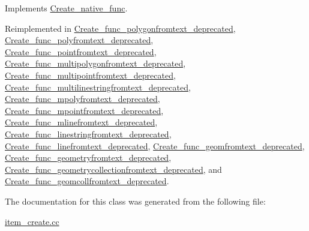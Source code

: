 Implements \mbox{\hyperlink{classCreate__native__func_a52a42d6a191ca6e9627fb34d91e97ebc}{Create\+\_\+native\+\_\+func}}.



Reimplemented in \mbox{\hyperlink{classCreate__func__polygonfromtext__deprecated_ae42cae5e01546d848a75369762244ca5}{Create\+\_\+func\+\_\+polygonfromtext\+\_\+deprecated}}, \mbox{\hyperlink{classCreate__func__polyfromtext__deprecated_ae2d1f5b987f4eee048383dff2fbb7d92}{Create\+\_\+func\+\_\+polyfromtext\+\_\+deprecated}}, \mbox{\hyperlink{classCreate__func__pointfromtext__deprecated_a15b37997c76797c4da46be0fd82afae1}{Create\+\_\+func\+\_\+pointfromtext\+\_\+deprecated}}, \mbox{\hyperlink{classCreate__func__multipolygonfromtext__deprecated_aa97a2a418f12fe63eb87ac20182a7790}{Create\+\_\+func\+\_\+multipolygonfromtext\+\_\+deprecated}}, \mbox{\hyperlink{classCreate__func__multipointfromtext__deprecated_a0855754fc0c084171c2acc7500603cf3}{Create\+\_\+func\+\_\+multipointfromtext\+\_\+deprecated}}, \mbox{\hyperlink{classCreate__func__multilinestringfromtext__deprecated_a8994e5152dc5e7d389dab02346f5e1eb}{Create\+\_\+func\+\_\+multilinestringfromtext\+\_\+deprecated}}, \mbox{\hyperlink{classCreate__func__mpolyfromtext__deprecated_af27e8741d038b263573cd51ad78608c3}{Create\+\_\+func\+\_\+mpolyfromtext\+\_\+deprecated}}, \mbox{\hyperlink{classCreate__func__mpointfromtext__deprecated_a51dc673c0da67b8c4cc35ede863275aa}{Create\+\_\+func\+\_\+mpointfromtext\+\_\+deprecated}}, \mbox{\hyperlink{classCreate__func__mlinefromtext__deprecated_ac980d27d0c98fd6a1957cdef2642f1dd}{Create\+\_\+func\+\_\+mlinefromtext\+\_\+deprecated}}, \mbox{\hyperlink{classCreate__func__linestringfromtext__deprecated_ada58651e2d023a4363d088fd5370f8af}{Create\+\_\+func\+\_\+linestringfromtext\+\_\+deprecated}}, \mbox{\hyperlink{classCreate__func__linefromtext__deprecated_aa8e6c707d1a042ae6b57389b005f7e35}{Create\+\_\+func\+\_\+linefromtext\+\_\+deprecated}}, \mbox{\hyperlink{classCreate__func__geomfromtext__deprecated_a48d582343e1887825483f737898d2b1f}{Create\+\_\+func\+\_\+geomfromtext\+\_\+deprecated}}, \mbox{\hyperlink{classCreate__func__geometryfromtext__deprecated_ad8af1636a8592df47f1608e873a26929}{Create\+\_\+func\+\_\+geometryfromtext\+\_\+deprecated}}, \mbox{\hyperlink{classCreate__func__geometrycollectionfromtext__deprecated_a82b818db18364fb0619ad2ca6a1551ce}{Create\+\_\+func\+\_\+geometrycollectionfromtext\+\_\+deprecated}}, and \mbox{\hyperlink{classCreate__func__geomcollfromtext__deprecated_a07bdd5b9d90da6e646fd169dbdf04ea2}{Create\+\_\+func\+\_\+geomcollfromtext\+\_\+deprecated}}.



The documentation for this class was generated from the following file\+:\begin{DoxyCompactItemize}
\item 
\mbox{\hyperlink{item__create_8cc}{item\+\_\+create.\+cc}}\end{DoxyCompactItemize}

